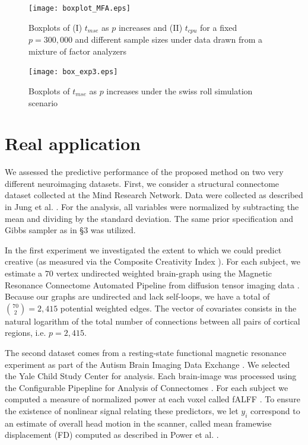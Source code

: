 \documentclass{article} %
\begin{document}
\begin{figure}[h!]
\centering
\texttt{[image: boxplot\_MFA.eps]} 
\caption{Boxplots of (I) $t_{mse}$  as $p$ increases and (II) $t_{cpu}$ for a fixed $p=300,000$ and different sample sizes under data drawn from a mixture of factor analyzers} \label{MFA:plot}
\end{figure}


\begin{figure}
\centering
\texttt{[image: box\_exp3.eps]} 
\caption{Boxplots of  $t_{mse}$ as $p$ increases under the swiss roll simulation scenario} \label{swiss:plot}
\end{figure}



\section{Real application}

We assessed the predictive performance of the proposed method on two very different neuroimaging datasets. First, we consider a structural connectome dataset collected at the Mind Research Network.  Data were collected as described in Jung et al. \cite{Jung2010}. For the analysis, all variables were normalized by subtracting the mean and dividing by the standard deviation. The same prior specification and Gibbs sampler as in \S 3 was  utilized. 

In the first experiment we investigated the extent to which we could predict creative (as measured via the Composite Creativity Index \cite{Arden2010}).   For each subject, we estimate a $70$ vertex undirected weighted brain-graph using the Magnetic Resonance Connectome Automated Pipeline \cite{MRCAP11} from diffusion tensor imaging data \cite{Mori2006}. Because our graphs are undirected and lack self-loops, we have a total of $\binom{70}{2}=2,415$ potential weighted edges. The vector of covariates consists in the natural logarithm of the total number of connections between all pairs of cortical regions, i.e. $p=2,415$. 

The second dataset comes from a resting-state functional magnetic resonance experiment as part of the Autism Brain Imaging Data Exchange \cite{Autism}.  We selected the Yale Child Study Center for analysis.  Each brain-image was processed using the Configurable Pipepline for Analysis of Connectomes \cite{cpac}. For each subject we computed a measure of normalized power at each voxel called fALFF \cite{Zou2008}.  To ensure the existence of nonlinear signal relating these predictors, we let $y_i$ correspond to an estimate of overall head motion in the scanner, called mean framewise displacement (FD) computed as described in Power et al. \cite{power}. 
\end{document}
